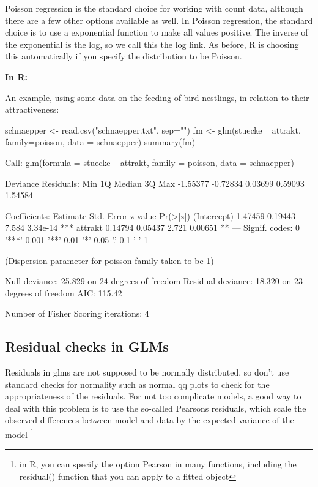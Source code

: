 \documentclass[a4paper,twoside]{tufte-book}\usepackage[]{graphicx}\usepackage[]{color}
\begin{document}
Poisson regression is the standard choice for working with count data, although there are a few other options available as well. In Poisson regression, the standard choice is to use a exponential function to make all values positive. The inverse of the exponential is the log, so we call this the log link. As before, R is choosing this automatically if you specify the distribution to be Poisson. 

\vspace{1cm}
\begin{fullwidth}
\begin{mdframed}
    
\textbf{In R:} 

An example, using some data on the feeding of bird nestlings, in relation to their attractiveness:
\begin{Schunk}
\begin{Sinput}
schnaepper <- read.csv("schnaepper.txt", sep="")
fm <- glm(stuecke ~ attrakt, family=poisson, data = schnaepper)
summary(fm)
\end{Sinput}
\begin{Soutput}

Call:
glm(formula = stuecke ~ attrakt, family = poisson, data = schnaepper)

Deviance Residuals: 
     Min        1Q    Median        3Q       Max  
-1.55377  -0.72834   0.03699   0.59093   1.54584  

Coefficients:
            Estimate Std. Error z value Pr(>|z|)    
(Intercept)  1.47459    0.19443   7.584 3.34e-14 ***
attrakt      0.14794    0.05437   2.721  0.00651 ** 
---
Signif. codes:  0 '***' 0.001 '**' 0.01 '*' 0.05 '.' 0.1 ' ' 1

(Dispersion parameter for poisson family taken to be 1)

    Null deviance: 25.829  on 24  degrees of freedom
Residual deviance: 18.320  on 23  degrees of freedom
AIC: 115.42

Number of Fisher Scoring iterations: 4
\end{Soutput}
\end{Schunk}

\end{mdframed}
\end{fullwidth} 


\subsection{Residual checks in GLMs}

Residuals in glms are not supposed to be normally distributed, so don't use standard checks for normality such as normal qq plots to check for the appropriateness of the residuals. For not too complicate models, a good way to deal with this problem is to use the so-called Pearsons residuals, which scale the observed differences between model and data by the expected variance of the model \footnote{in R, you can specify the option Pearson in many functions, including the residual() function that you can apply to a fitted object}
\end{document}
